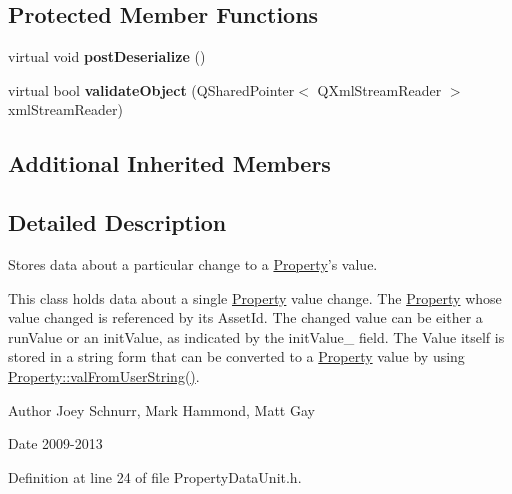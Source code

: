 \subsection*{Protected Member Functions}
\begin{DoxyCompactItemize}
\item 
\hypertarget{class_picto_1_1_property_data_unit_a877eb5d7babb535544ebb3292000423e}{virtual void {\bfseries post\-Deserialize} ()}\label{class_picto_1_1_property_data_unit_a877eb5d7babb535544ebb3292000423e}

\item 
\hypertarget{class_picto_1_1_property_data_unit_ac83f023f4bb09600c6b01b6173edbae7}{virtual bool {\bfseries validate\-Object} (Q\-Shared\-Pointer$<$ Q\-Xml\-Stream\-Reader $>$ xml\-Stream\-Reader)}\label{class_picto_1_1_property_data_unit_ac83f023f4bb09600c6b01b6173edbae7}

\end{DoxyCompactItemize}
\subsection*{Additional Inherited Members}


\subsection{Detailed Description}
Stores data about a particular change to a \hyperlink{class_picto_1_1_property}{Property}'s value. 

This class holds data about a single \hyperlink{class_picto_1_1_property}{Property} value change. The \hyperlink{class_picto_1_1_property}{Property} whose value changed is referenced by its Asset\-Id. The changed value can be either a run\-Value or an init\-Value, as indicated by the init\-Value\-\_\- field. The Value itself is stored in a string form that can be converted to a \hyperlink{class_picto_1_1_property}{Property} value by using \hyperlink{class_picto_1_1_property_ac895b7d7c8a015e18deed4a71443b29a}{Property\-::val\-From\-User\-String()}. \begin{DoxyAuthor}{Author}
Joey Schnurr, Mark Hammond, Matt Gay 
\end{DoxyAuthor}
\begin{DoxyDate}{Date}
2009-\/2013 
\end{DoxyDate}


Definition at line 24 of file Property\-Data\-Unit.\-h.



